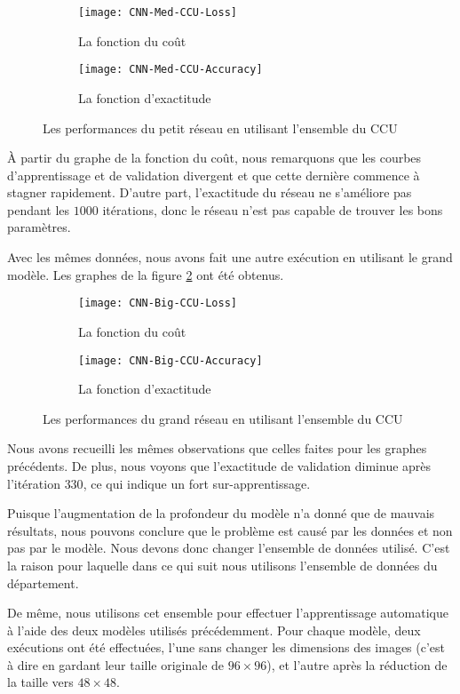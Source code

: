 \begin{figure}[h]
\centering
\begin{subfigure}{0.8\textwidth}
  \texttt{[image: CNN-Med-CCU-Loss]}
  \caption{La fonction du coût}
\end{subfigure}
\begin{subfigure}{0.8\textwidth}
  \texttt{[image: CNN-Med-CCU-Accuracy]}
  \caption{La fonction d'exactitude}
\end{subfigure}
\caption{Les performances du petit réseau en utilisant l'ensemble du CCU\label{fig:med_ccu}}
\end{figure}

\`A partir du graphe de la fonction du coût, nous remarquons que les courbes
d'apprentissage et de validation divergent et que cette dernière commence
à stagner rapidement. D'autre part, l'exactitude du réseau ne s'améliore pas
pendant les $1000$ itérations, donc le réseau n'est pas capable de trouver les bons
paramètres.

Avec les mêmes données, nous avons fait une autre exécution en utilisant le grand
modèle. Les graphes de la figure \ref{fig:big_ccu} ont été obtenus.

\begin{figure}[h]
\centering
\begin{subfigure}{0.9\textwidth}
  \texttt{[image: CNN-Big-CCU-Loss]}
  \caption{La fonction du coût}
\end{subfigure}
\begin{subfigure}{0.9\textwidth}
  \texttt{[image: CNN-Big-CCU-Accuracy]}
  \caption{La fonction d'exactitude}
\end{subfigure}
\caption{Les performances du grand réseau en utilisant l'ensemble du CCU\label{fig:big_ccu}}
\end{figure}

Nous avons recueilli les mêmes observations que celles faites pour les graphes précédents.
De plus, nous voyons que l'exactitude de validation diminue après l'itération
$330$, ce qui indique un fort sur-apprentissage.

Puisque l'augmentation de la profondeur du modèle n'a donné que de mauvais
résultats, nous pouvons conclure que le problème est causé par les données et non pas
par le modèle. Nous devons donc changer l'ensemble de données utilisé. C'est
la raison pour laquelle dans ce qui suit nous utilisons l'ensemble de données du département.

De même, nous utilisons cet ensemble pour effectuer l'apprentissage automatique
à l'aide des deux modèles utilisés précédemment. Pour chaque modèle, deux exécutions
ont été effectuées, l'une sans changer les dimensions des images (c'est à dire en
gardant leur taille originale de $96 \times 96$), et l'autre après la réduction
de la taille vers $48 \times 48$.


